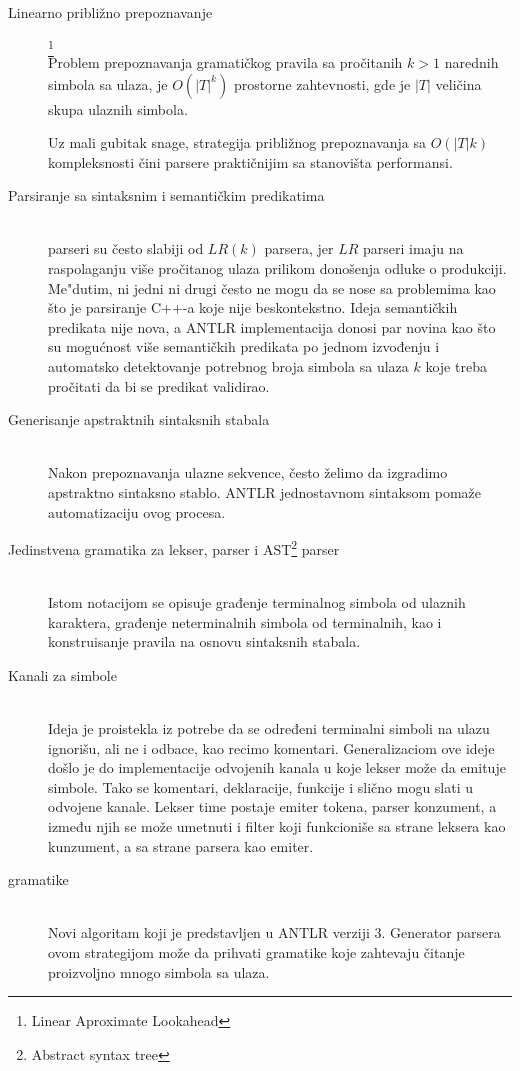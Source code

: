 \begin{description}

	\item[Linearno približno prepoznavanje]\footnote{\eng Linear Aproximate Lookahead} \hfill \\
	Problem prepoznavanja gramatičkog pravila sa pročitanih $k > 1$ narednih simbola sa ulaza, je $O(|T|^{k})$ prostorne zahtevnosti, gde je $|T|$ veličina skupa ulaznih simbola. 
	
	Uz mali gubitak snage, strategija približnog prepoznavanja sa $O(|T|k)$ kompleksnosti čini \LLk parsere praktičnijim sa stanovišta performansi.
	\item[Parsiranje sa sintaksnim i semantičkim predikatima] \hfill \\
	\LLk parseri su često slabiji od $LR(k)$ parsera, jer $LR$ parseri imaju na raspolaganju više pročitanog ulaza prilikom donošenja odluke o produkciji.
	Me"dutim, ni jedni ni drugi često ne mogu da se nose sa problemima kao što je parsiranje C++-a koje nije beskontekstno.
	Ideja semantičkih predikata nije nova\cite{attributed-translations}, a ANTLR implementacija donosi par novina kao što su mogućnost više  semantičkih predikata po jednom izvođenju i automatsko detektovanje potrebnog broja simbola sa ulaza $k$ koje treba pročitati da bi se predikat validirao.

	\item[Generisanje apstraktnih sintaksnih stabala] \hfill \\
	Nakon prepoznavanja ulazne sekvence, često želimo da izgradimo apstraktno sintaksno stablo. ANTLR jednostavnom sintaksom pomaže automatizaciju ovog procesa.
	\item[Jedinstvena gramatika za lekser, parser i AST\footnote{\skr \eng Abstract syntax tree}  parser] \hfill \\
	Istom notacijom se opisuje građenje terminalnog simbola od ulaznih karaktera, građenje neterminalnih simbola od terminalnih, kao i konstruisanje pravila na osnovu sintaksnih stabala.
	\item[Kanali za simbole] \hfill \\
	Ideja je proistekla iz potrebe da se određeni terminalni simboli na ulazu ignorišu, ali ne i odbace, kao recimo komentari. 
Generalizaciom ove ideje došlo je do implementacije odvojenih kanala u koje lekser može da emituje simbole.
Tako se komentari, deklaracije, funkcije i slično mogu slati u odvojene kanale. 
Lekser time postaje emiter tokena, parser konzument, a između njih se može umetnuti i filter koji funkcioniše sa strane leksera kao kunzument, a sa strane parsera kao emiter.
	\item [\LLa gramatike] \hfill \\
	Novi algoritam koji je predstavljen u ANTLR verziji 3. Generator parsera ovom strategijom može da prihvati gramatike koje zahtevaju čitanje proizvoljno mnogo simbola sa ulaza.

\end{description}


